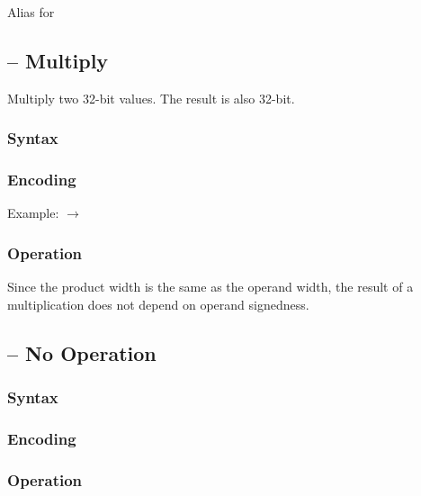 \documentclass[a4paper,12pt,twoside,extrafontsizes]{memoir}
\begin{document}
{

Alias for 

\subsection{ -- Multiply}
\label{subsec:instr:mul}

Multiply two 32-bit values. The result is also 32-bit.

\subsubsection{Syntax}


\subsubsection{Encoding}


Example:  $\rightarrow$ 

\subsubsection{Operation}


Since the product width is the same as the operand width, the result of a multiplication does not depend on operand signedness.

\subsection{ -- No Operation}
\label{subsec:instr:nop}

\subsubsection{Syntax}


\subsubsection{Encoding}


\subsubsection{Operation}

}
\end{document}
